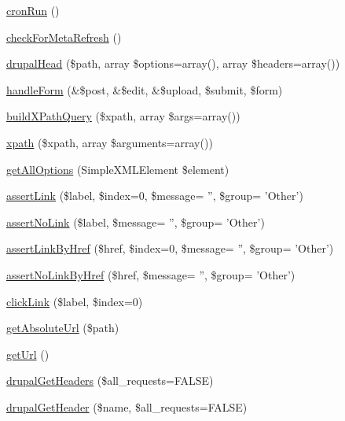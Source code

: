 \begin{DoxyCompactItemize}
\item 
\hyperlink{classDrupalWebTestCase_a74fdd4b3de72a3b340c3d6168a99d72c}{cronRun} ()
\item 
\hyperlink{classDrupalWebTestCase_a639bf5d4e0892c7d3659c224a609183c}{checkForMetaRefresh} ()
\item 
\hyperlink{classDrupalWebTestCase_adfed12ec9ae7e71a0de659894d5b171d}{drupalHead} (\$path, array \$options=array(), array \$headers=array())
\item 
\hyperlink{classDrupalWebTestCase_af28fa56d6175e845d39c2db518544633}{handleForm} (\&\$post, \&\$edit, \&\$upload, \$submit, \$form)
\item 
\hyperlink{classDrupalWebTestCase_a97a3a1af39934d2f3d04dcba5967f90c}{buildXPathQuery} (\$xpath, array \$args=array())
\item 
\hyperlink{classDrupalWebTestCase_a3e5294d131f96468ef55f6f56192c77b}{xpath} (\$xpath, array \$arguments=array())
\item 
\hyperlink{classDrupalWebTestCase_a242a13b4aaf558f5b4030c0ad2b3789c}{getAllOptions} (SimpleXMLElement \$element)
\item 
\hyperlink{classDrupalWebTestCase_aa78cd0d7454235fcad55aaf14a77ed40}{assertLink} (\$label, \$index=0, \$message= '', \$group= 'Other')
\item 
\hyperlink{classDrupalWebTestCase_aebe9c02edc5edcf8e0b97d5c9742070b}{assertNoLink} (\$label, \$message= '', \$group= 'Other')
\item 
\hyperlink{classDrupalWebTestCase_ad2af4071eecc15d87251bf2689bedd0c}{assertLinkByHref} (\$href, \$index=0, \$message= '', \$group= 'Other')
\item 
\hyperlink{classDrupalWebTestCase_a7babab352277932e47debf3cb29f4b80}{assertNoLinkByHref} (\$href, \$message= '', \$group= 'Other')
\item 
\hyperlink{classDrupalWebTestCase_a716c6eef22f216695376ea5b531ce9a1}{clickLink} (\$label, \$index=0)
\item 
\hyperlink{classDrupalWebTestCase_ab170c2353296a22d88f4c7da58418d57}{getAbsoluteUrl} (\$path)
\item 
\hyperlink{classDrupalWebTestCase_a71fa7ff2a1b0b76829605458e875c9a0}{getUrl} ()
\item 
\hyperlink{classDrupalWebTestCase_a9bbd6c61b69af17eeb79d59b1632a691}{drupalGetHeaders} (\$all\_\-requests=FALSE)
\item 
\hyperlink{classDrupalWebTestCase_a2a5d661d1f61cf9ac2c8bb5969d5d373}{drupalGetHeader} (\$name, \$all\_\-requests=FALSE)
\item 

\end{DoxyCompactItemize}
